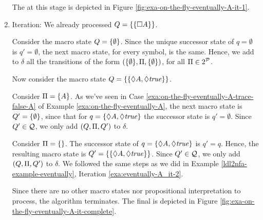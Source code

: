 \begin{example}
\begin{enumerate}
		The \DFA at this stage is depicted in Figure \ref{fig:exa-on-the-fly-eventually-A-it-1}.
		
		\item Iteration: We already processed $Q=\{\{\Box A\}\}$.
		
		Consider the macro state $Q = \{\emptyset\}$. Since 
		the unique successor state of $q=\emptyset$ is $q'=\emptyset$, the next macro state, for every symbol, is the same. Hence, we add to $\delta$ all the transitions of the form $(\{\emptyset\}, \Pi, \{\emptyset\})$, for all $\Pi \in 2^{\mathcal{P}}$.
		
		Now consider the macro state $Q = \{\{\Diamond A, \Diamond \mathit{true}\}\}$. 
		
		Consider $\Pi = \{A\}$. As we've seen in Case \ref{exa:on-the-fly-eventually-A-trace-false-A} of Example \ref{exa:on-the-fly-eventually-A}, the next macro state is $Q'=\{\emptyset\}$, since that for $q = \{\Diamond A, \Diamond \mathit{true}\}$ the successor state is $q'=\emptyset$. Since $Q'\in \mathcal{Q}$, we only add $(Q, \Pi, Q')$ to $\delta$.
		
		Consider $\Pi = \{\}$. The successor state of $q = \{\Diamond A, \Diamond \mathit{true}\}$ is $q' = q$.
		Hence, the resulting macro state is $Q' = \{\{\Diamond A, \Diamond \mathit{true}\}\}$. Since $Q'\in \mathcal{Q}$, we only add $(Q, \Pi, Q')$ to $\delta$. We followed the same steps as we did in Example \ref{ldl2nfa-example-eventually}, Iteration  \ref{exa:eventually-A_it-2}.
		
		Since there are no other macro states nor propositional interpretation to process, the algorithm terminates. The final \DFA is depicted in Figure \ref{fig:exa-on-the-fly-eventually-A-it-complete}.
		
	\end{enumerate}
	

\end{example}
